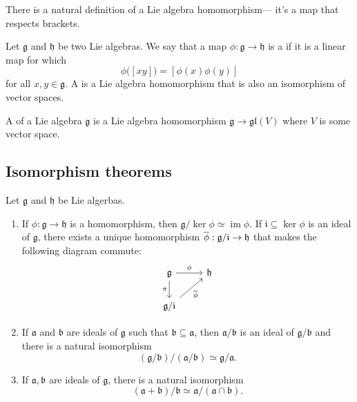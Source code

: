 \documentclass{article}
\newcommand{\lb}[1]{\ensuremath{\left[{#1}\right]}}
\DeclareMathOperator{\im}{im}
\newcommand*\frka{{\ensuremath{\mathfrak{a}}}}
\newcommand*\frkb{{\ensuremath{\mathfrak{b}}}}
\newcommand*\frkg{{\ensuremath{\mathfrak{g}}}}
\newcommand*\frkh{{\ensuremath{\mathfrak{h}}}}
\newcommand*\frki{{\ensuremath{\mathfrak{i}}}}
\newcommand*\glalg{\ensuremath{\mathfrak{gl}}}
\begin{document}
There is a natural definition of a Lie algebra homomorphism--- it's a map that respects brackets.

\begin{definition}
    \label{def:LieAlgHom}
    Let $\frkg$ and $\frkh$ be two Lie algebras.
    We say that a map $\phi: \frkg \to \frkh$ is a  if it is a linear map for which
    \[
        \phi\Big(\lb{xy}\Big)
        =
        \lb{\phi(x)\phi(y)}
    \]
    for all $x,y \in \frkg$. 
    A  is a Lie algebra homomorphism that is also an isomorphism of vector spaces.
\end{definition}


\begin{definition}
    A  of a Lie algebra $\frkg$ is a Lie algebra homomorphism $\frkg \to \glalg(V)$ where $V$ is some vector space.
\end{definition}

\subsection{Isomorphism theorems}

\begin{theorem}
    Let $\frkg$ and $\frkh$ be Lie algerbas.
    \begin{enumerate}[label=(\alph*)]
        \item \label{thm:FirstIsomorphismThm}
            If $\phi: \frkg \to \frkh$ is a homomorphism, then $\frkg / \ker \phi \simeq \im \phi$.
            If $\frki \subseteq \ker \phi$ is an ideal of $\frkg$, there exists a unique homomorphism $\barphi: \frkg/\frki \to \frkh$ that makes the following diagram commute:
            \[
                \begin{tikzcd}
                    \frkg \arrow[r, "\phi"] \arrow[d, "\pi"'] & \frkh \\ 
                                                             \frkg/\frki \arrow[ur, "\barphi"']
                \end{tikzcd}
            \]
        \item 
            If $\frka$ and $\frkb$ are ideals of $\frkg$ such that $\frkb \subseteq \frka$, then $\frka/\frkb$ is an ideal of $\frkg/\frkb$ and there is a natural isomorphism
            \[
                (\frkg/\frkb)/(\frka/\frkb)
                \simeq
                \frkg/\frka.
            \]
        \item 
            If $\frka, \frkb$ are ideals of $\frkg$, there is a natural isomorphism
            \[
                (\frka + \frkb)/\frkb
                \simeq
                \frka/(\frka \cap \frkb).
            \]
    \end{enumerate}
\end{theorem}
\end{document}
